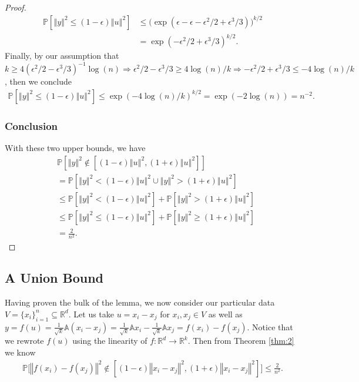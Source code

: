 \documentclass{article}
\begin{document}
\begin{proof}
\begin{align*}
\mathbb{P}\left[ \left\Vert y \right\Vert^2 \leq (1-\epsilon) \left\Vert u \right\Vert^2 \right] &\leq \bigg(\exp(\epsilon - \epsilon - \epsilon^2/2 + \epsilon^3/3) \bigg)^{k/2}\\
& = \exp(-\epsilon^2/2 + \epsilon^3/3)^{k/2}.
\end{align*}
Finally, by our assumption that $k \geq 4(\epsilon^2/2 - \epsilon^3/3)^{-1} \log(n) \Rightarrow \epsilon^2/2 - \epsilon^3/3 \geq 4\log(n)/k \Rightarrow  -\epsilon^2/2 + \epsilon^3/3 \leq -4\log(n)/k$, then we conclude
\begin{align*}
    \mathbb{P}\left[ \left\Vert y \right\Vert^2 \leq (1-\epsilon) \left\Vert u \right\Vert^2 \right] \leq \exp(-4 \log(n)/k)^{k/2} = \exp(-2\log(n)) = n^{-2}.
\end{align*}

\subsubsection{Conclusion}
With these two upper bounds, we have
\begin{align*}
&\mathbb{P} \left[ \left\Vert y \right\Vert^2 \notin \left[(1 - \epsilon)\left\Vert u \right\Vert^2, (1 + \epsilon)\left\Vert u \right\Vert^2 \right] \right]\\
&= \mathbb{P} \left[ \left\Vert y \right\Vert^2 < (1 - \epsilon) \left\Vert u \right\Vert^2 \cup \left\Vert y \right\Vert^2 > (1 + \epsilon) \left\Vert u \right\Vert^2 \right] \\
&\leq \mathbb{P} \left[ \left \Vert y \right \Vert^2 < (1 - \epsilon) \left \Vert u \right \Vert^2\right] + \mathbb{P} \left[ \left \Vert y \right \Vert^2 > (1 + \epsilon) \left \Vert u \right \Vert^2\right]\\
&\leq \mathbb{P} \left[ \left \Vert y \right \Vert^2 \leq (1 - \epsilon) \left \Vert u \right \Vert^2\right] + \mathbb{P} \left[ \left \Vert y \right \Vert^2 \geq (1 + \epsilon) \left \Vert u \right \Vert^2\right]\\
&= \frac{2}{n^2}.
\end{align*}
\end{proof}

\subsection{A Union Bound}
Having proven the bulk of the lemma, we now consider our particular data $V = \{x_i\}_{i=1}^n \subseteq \mathbb{R}^d$. Let us take $u = x_i - x_j$ for $x_i, x_j \in V$ as well as  $y = f(u) = \frac{1}{\sqrt{k}} \mathbb{A}(x_i - x_j) = \frac{1}{\sqrt{k}} \mathbb{A}x_i - \frac{1}{\sqrt{k}} \mathbb{A}x_j = f(x_i) - f(x_j)$. Notice that we rewrote $f(u)$ using the linearity of $f: \mathbb{R}^d \rightarrow \mathbb{R}^k$. Then from Theorem \ref{thm:2} we know
    \begin{align*}
        \mathbb{P}\bigg[ \left\Vert f(x_i) - f(x_j) \right\Vert^2 \notin \left[(1 - \epsilon)\left\Vert x_i - x_j \right\Vert^2, (1 + \epsilon)\left\Vert x_i - x_j \right\Vert^2 \right] \bigg] \leq \frac{2}{n^2}.
    \end{align*}
    
\end{document}
